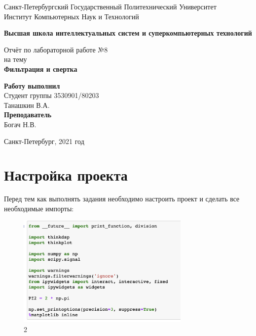 \documentclass[10pt,a4paper,oneside]{article}
\begin{document}
\begin{titlepage}
\newpage
	\begin{center}
		\Large Санкт-Петербургский Государственный Политехнический Университет\\
		Институт Компьютерных Наук и Технологий\\
	\end{center}
	\begin{center}
		\large\textbf {Высшая школа интеллектуальных систем и суперкомпьютерных технологий}
	\end{center}
	
	\vspace{5em}
	\begin{center}
		\large{Отчёт по лабораторной работе №8 \\ на тему \\
		\textbf{Фильтрация и свертка} }
	\end{center}
	
	\vspace{25em}
	\begin{flushright}
		\textbf{Работу выполнил\\}Студент группы 3530901/80203 \\ Танашкин В.А.\\
		\textbf{Преподаватель\\}Богач Н.В. 
	\end{flushright}
	
	\vspace{\fill}%
	\begin{center}
	Санкт-Петербург, 2021 год	
	\end{center}
\end{titlepage} %

\section{Настройка проекта}
Перед тем как выполнять задания необходимо настроить проект и сделать все необходимые импорты:

\begin{figure}[H]
        \centering
        \includegraphics[width=0.75\textwidth]{pics/0.png}
        \caption{2}
        \label{fig:first}
\end{figure}
\end{document}
